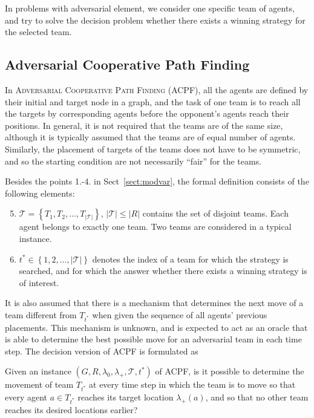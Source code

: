 In problems with adversarial element, we consider one specific team of agents, and try to solve the decision problem whether there exists a winning strategy for the selected team. 

\subsection{Adversarial Cooperative Path Finding}

In \textsc{Adversarial Cooperative Path Finding} (ACPF), all the agents are defined by their initial and target node in a graph, 
and the task of one team is to reach all the targets by corresponding agents before the opponent's agents reach their positions.
In general, it is not required that the teams are of the same size, although it is typically assumed that the teams are of equal number of agents.
Similarly, the placement of targets of the teams does not have to be symmetric, and so the starting condition are not necessarily ``fair'' for the teams.

Besides the points 1.-4. in Sect~\ref{sect:modvar}, the formal definition consists of the following elements:
\begin{enumerate}
		\setcounter{enumi}{4}
	\item $\mathcal{T}=\left\{T_1,T_2,\dots,T_{|\mathcal{T}|}\right\}$, $|\mathcal{T}|\leq|R|$ contains the set of disjoint teams.
		Each agent belongs to exactly one team. 
		Two teams are considered in a typical instance. 
	\item $t^*\in\left\{1,2,\dots,|\mathcal{T}|\right\}$ denotes the index of a team for which the strategy is searched, 
		and for which the answer whether there exists a winning strategy is of interest.
\end{enumerate}
It is also assumed that there is a mechanism that determines the next move of a team different from $T_{t^*}$ when given the sequence of all agents' previous placements. 
This mechanism is unknown, and is expected to act as an oracle that is able to determine the best possible move for an adversarial team in each time step.
The decision version of ACPF is formulated as
\begin{problem}
Given an instance $(G,R,\lambda_0,\lambda_+,\mathcal{T},t^*)$ of ACPF, is it possible to determine the movement of team $T_{t^*}$ at every time step in which the team is to move 
so that every agent $a\in T_{t^*}$ reaches its target location $\lambda_+(a)$, and so that no other team reaches its desired locations earlier?
\end{problem}


